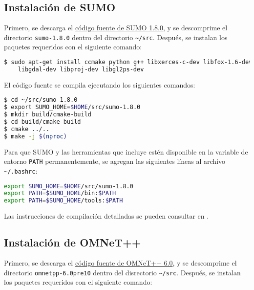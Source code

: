 \subsection{Instalación de SUMO}
\label{subsec:instalacion_sumo}

Primero, se descarga el
\href{https://sourceforge.net/projects/sumo/files/sumo/}{código fuente de SUMO
1.8.0}, y se descomprime el directorio {\lstinline[language=bash]!sumo-1.8.0!}
dentro del directorio {\lstinline[language=bash]!~/src!}. Después, se instalan
los paquetes requeridos con el siguiente comando:

\begin{lstlisting}[language=bash]
$ sudo apt-get install ccmake python g++ libxerces-c-dev libfox-1.6-dev \
    libgdal-dev libproj-dev libgl2ps-dev
\end{lstlisting}

El código fuente se compila ejecutando los siguientes comandos:

\begin{lstlisting}[language=bash]
$ cd ~/src/sumo-1.8.0
$ export SUMO_HOME=$HOME/src/sumo-1.8.0
$ mkdir build/cmake-build
$ cd build/cmake-build
$ cmake ../..
$ make -j $(nproc)
\end{lstlisting}

Para que SUMO y las herramientas que incluye estén disponible en la variable de
entorno {\lstinline[language=bash]!PATH!} permanentemente, se agregan las
siguientes líneas al archivo {\lstinline[language=bash]!~/.bashrc!}:

\begin{lstlisting}[language=bash]
export SUMO_HOME=$HOME/src/sumo-1.8.0
export PATH=$SUMO_HOME/bin:$PATH
export PATH=$SUMO_HOME/tools:$PATH
\end{lstlisting}

Las instrucciones de compilación detalladas se pueden consultar en
\cite{CompilacionSUMO}.


\subsection{Instalación de OMNeT++}
\label{subsec:instalacion_omnet}

Primero, se descarga el \href{https://omnetpp.org/download/}{código fuente de
OMNeT++ 6.0}, y se descomprime el directorio
{\lstinline[language=bash]!omnetpp-6.0pre10!} dentro del disrectorio
{\lstinline[language=bash]!~/src!}. Después, se instalan los paquetes
requeridos con el siguiente comando:

